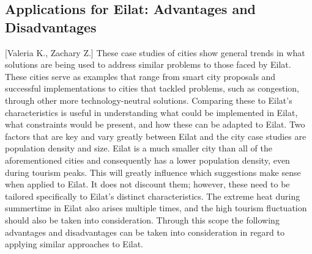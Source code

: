 \documentclass[12pt]{article}                               %
\begin{document}
\subsection{Applications for Eilat: Advantages and Disadvantages}[Valeria K., Zachary Z.]
These case studies of cities show general trends in what solutions are being used to address similar problems to those faced by Eilat. These cities serve as examples that range from smart city proposals and successful implementations to cities that tackled problems, such as congestion, through other more technology-neutral solutions. Comparing these to Eilat's characteristics is useful in understanding what could be implemented in Eilat, what constraints would be present, and how these can be adapted to Eilat. Two factors that are key and vary greatly between Eilat and the city case studies are population density and size. Eilat is a much smaller city than all of the aforementioned cities and consequently has a lower population density, even during tourism peaks. This will greatly influence which suggestions make sense when applied to Eilat. It does not discount them; however, these need to be tailored specifically to Eilat's distinct characteristics. The extreme heat during summertime in Eilat also arises multiple times, and the high tourism fluctuation should also be taken into consideration. Through this scope the following advantages and disadvantages can be taken into consideration in regard to applying similar approaches to Eilat. 
\end{document}
